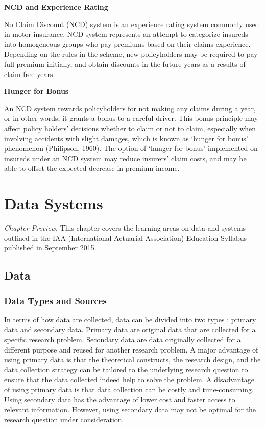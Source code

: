 \documentclass[]{book}
\theoremstyle{definition}
\theoremstyle{definition}
\theoremstyle{definition}
\theoremstyle{remark}
\begin{document}
\textbf{NCD and Experience Rating}

No Claim Discount (NCD) system is an experience rating system commonly
used in motor insurance. NCD system represents an attempt to categorize
insureds into homogeneous groups who pay premiums based on their claims
experience. Depending on the rules in the scheme, new policyholders may
be required to pay full premium initially, and obtain discounts in the
future years as a results of claim-free years.

\textbf{Hunger for Bonus }

An NCD system rewards policyholders for not making any claims during a
year, or in other words, it grants a bonus to a careful driver. This
bonus principle may affect policy holders' decisions whether to claim or
not to claim, especially when involving accidents with slight damages,
which is known as `hunger for bonus' phenomenon (Philipson, 1960). The
option of `hunger for bonus' implemented on insureds under an NCD system
may reduce insurers' claim costs, and may be able to offset the expected
decrease in premium income.

\chapter{Data Systems}\label{data-systems}

\emph{Chapter Preview}. This chapter covers the learning areas on data
and systems outlined in the IAA (International Actuarial Association)
Education Syllabus published in September 2015.

\section{Data}\label{data}

\subsection{Data Types and Sources}\label{data-types-and-sources}

In terms of how data are collected, data can be divided into two types
\citep{hox2005data}: primary data and secondary data. Primary data are
original data that are collected for a specific research problem.
Secondary data are data originally collected for a different purpose and
reused for another research problem. A major advantage of using primary
data is that the theoretical constructs, the research design, and the
data collection strategy can be tailored to the underlying research
question to ensure that the data collected indeed help to solve the
problem. A disadvantage of using primary data is that data collection
can be costly and time-consuming. Using secondary data has the advantage
of lower cost and faster access to relevant information. However, using
secondary data may not be optimal for the research question under
consideration.
\end{document}
